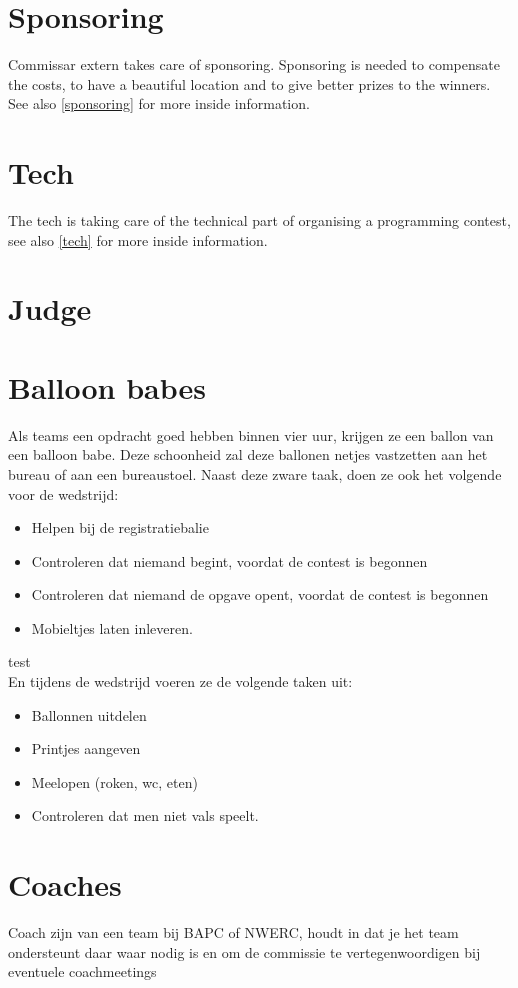 \section{Sponsoring\label{sponsoringTasks}}
Commissar extern takes care of sponsoring. Sponsoring is needed to compensate the costs, to have a beautiful location and to give better prizes to the winners. See also \ref{sponsoring} for more inside information.
	
\section{Tech}\label{techTasks}
The tech is taking care of the technical part of organising a programming contest, see also \ref{tech} for more inside information.

\section{Judge}\label{judge}

\section{Balloon babes}
Als teams een opdracht goed hebben binnen vier uur, krijgen ze een ballon van een balloon babe. Deze schoonheid zal deze ballonen netjes vastzetten aan het bureau of aan een bureaustoel. Naast deze zware taak, doen ze ook het volgende voor de wedstrijd:
\begin{itemize}
\item Helpen bij de registratiebalie
\item Controleren dat niemand begint, voordat de contest is begonnen
\item Controleren dat niemand de opgave opent, voordat de contest is begonnen
\item Mobieltjes laten inleveren.
\end{itemize}
{\color{white}test}\\
En tijdens de wedstrijd voeren ze de volgende taken uit:
\begin{itemize}
\item Ballonnen uitdelen
\item Printjes aangeven
\item Meelopen (roken, wc, eten)
\item Controleren dat men niet vals speelt.
\end{itemize}

\section{Coaches}
Coach zijn van een team bij BAPC of NWERC, houdt in dat je het team ondersteunt daar waar nodig is en om de commissie te vertegenwoordigen bij eventuele coachmeetings 

